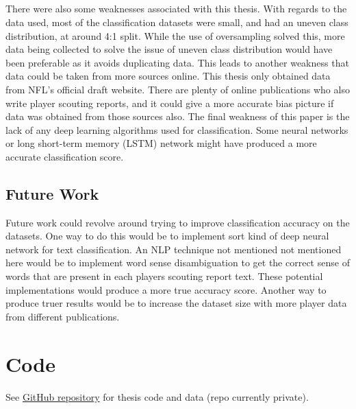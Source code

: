 \documentclass[oneside,12pt]{Classes/RoboticsLaTeX}
\begin{document}
\paragraph{}
There were also some weaknesses associated with this thesis. With regards to the data used, most of the classification datasets were small, and had an uneven class distribution, at around 4:1 split. While the use of oversampling solved this, more
data being collected to solve the issue of uneven class distribution would have been preferable as it avoids duplicating data. This leads to another weakness that data could be taken from more sources online. This thesis only obtained data from 
NFL's official draft website. There are plenty of online publications who also write player scouting reports, and it could give a more accurate bias picture if data was obtained from those sources also. The final weakness of this paper is the lack
of any deep learning algorithms used for classification. Some neural networks or long short-term memory (LSTM) network might have produced a more accurate classification score.

\section{Future Work}
Future work could revolve around trying to improve classification accuracy on the datasets. One way to do this would be to implement sort kind of deep neural network for text classification. An NLP technique not mentioned not mentioned here would be to
implement word sense disambiguation to get the correct sense of words that are present in each players scouting report text. These potential implementations would produce a more true accuracy score. Another way to produce truer results would be to increase
the dataset size with more player data from different publications.


\renewcommand{\bibname}{References}           %


\appendix
\chapter{Code} 
\label{chap:Code}
See \href{https://github.com/EoghanOGallchoir/Thesis_Code}{GitHub repository} for thesis code and data (repo currently private).
\end{document}
